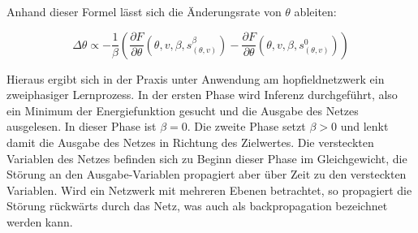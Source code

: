 Anhand dieser Formel lässt sich die Änderungsrate von \(\theta\) ableiten:

\[\Delta\theta\propto -\frac{1}{\beta}\left(\frac{\partial F}{\partial \theta}(\theta,v,\beta,s_{(\theta,v)}^\beta)-\frac{\partial F}{\partial \theta}(\theta,v,\beta,s_{(\theta,v)}^0)\right)\]

Hieraus ergibt sich in der Praxis unter Anwendung am \gls{hopfieldnetzwerk} ein zweiphasiger Lernprozess. In der ersten Phase wird Inferenz durchgeführt, also ein Minimum der Energiefunktion gesucht und die Ausgabe des Netzes ausgelesen. In dieser Phase ist \(\beta=0\). Die zweite Phase setzt \(\beta>0\) und lenkt damit die Ausgabe des Netzes in Richtung des Zielwertes. Die versteckten Variablen des Netzes befinden sich zu Beginn dieser Phase im Gleichgewicht, die Störung an den Ausgabe-Variablen propagiert aber über Zeit zu den versteckten Variablen. Wird ein Netzwerk mit mehreren Ebenen betrachtet, so propagiert die Störung rückwärts durch das Netz, was auch als \gls{backpropagation} bezeichnet werden kann. \cite{Scellier2017}
